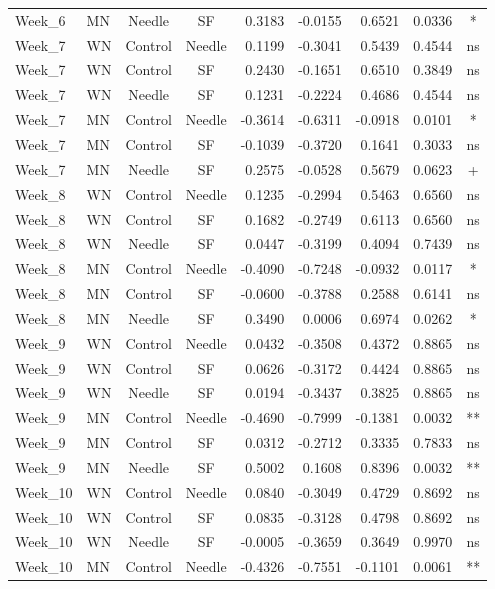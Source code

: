 \documentclass[
  12pt,
  letterpaper,
]{article}
\begin{document}
\begin{longtable}{llccrrrlc}
Week\_6 & MN & Needle & SF & 0.3183 & -0.0155 & 0.6521 & 0.0336 & * \\ 
Week\_7 & WN & Control & Needle & 0.1199 & -0.3041 & 0.5439 & 0.4544 & ns \\ 
Week\_7 & WN & Control & SF & 0.2430 & -0.1651 & 0.6510 & 0.3849 & ns \\ 
Week\_7 & WN & Needle & SF & 0.1231 & -0.2224 & 0.4686 & 0.4544 & ns \\ 
Week\_7 & MN & Control & Needle & -0.3614 & -0.6311 & -0.0918 & 0.0101 & * \\ 
Week\_7 & MN & Control & SF & -0.1039 & -0.3720 & 0.1641 & 0.3033 & ns \\ 
Week\_7 & MN & Needle & SF & 0.2575 & -0.0528 & 0.5679 & 0.0623 & + \\ 
Week\_8 & WN & Control & Needle & 0.1235 & -0.2994 & 0.5463 & 0.6560 & ns \\ 
Week\_8 & WN & Control & SF & 0.1682 & -0.2749 & 0.6113 & 0.6560 & ns \\ 
Week\_8 & WN & Needle & SF & 0.0447 & -0.3199 & 0.4094 & 0.7439 & ns \\ 
Week\_8 & MN & Control & Needle & -0.4090 & -0.7248 & -0.0932 & 0.0117 & * \\ 
Week\_8 & MN & Control & SF & -0.0600 & -0.3788 & 0.2588 & 0.6141 & ns \\ 
Week\_8 & MN & Needle & SF & 0.3490 & 0.0006 & 0.6974 & 0.0262 & * \\ 
Week\_9 & WN & Control & Needle & 0.0432 & -0.3508 & 0.4372 & 0.8865 & ns \\ 
Week\_9 & WN & Control & SF & 0.0626 & -0.3172 & 0.4424 & 0.8865 & ns \\ 
Week\_9 & WN & Needle & SF & 0.0194 & -0.3437 & 0.3825 & 0.8865 & ns \\ 
Week\_9 & MN & Control & Needle & -0.4690 & -0.7999 & -0.1381 & 0.0032 & ** \\ 
Week\_9 & MN & Control & SF & 0.0312 & -0.2712 & 0.3335 & 0.7833 & ns \\ 
Week\_9 & MN & Needle & SF & 0.5002 & 0.1608 & 0.8396 & 0.0032 & ** \\ 
Week\_10 & WN & Control & Needle & 0.0840 & -0.3049 & 0.4729 & 0.8692 & ns \\ 
Week\_10 & WN & Control & SF & 0.0835 & -0.3128 & 0.4798 & 0.8692 & ns \\ 
Week\_10 & WN & Needle & SF & -0.0005 & -0.3659 & 0.3649 & 0.9970 & ns \\ 
Week\_10 & MN & Control & Needle & -0.4326 & -0.7551 & -0.1101 & 0.0061 & ** \\ 

\end{longtable}
\end{document}
